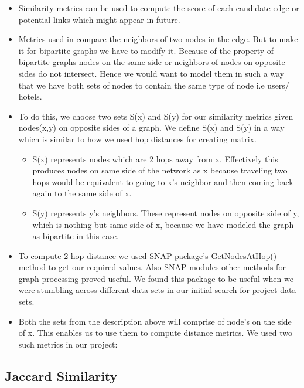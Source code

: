 \documentclass[letterpaper,twocolumn,11pt]{article}
\begin{document}
\begin{itemize}

\item Similarity metrics can be used to compute the score of each candidate edge or potential links which might appear in future.

\item Metrics used in \cite{four} compare the neighbors of two nodes in the edge. But to make it for bipartite graphs we have to modify it. Because of the property of bipartite graphs nodes on the same side or neighbors of nodes on opposite sides do not intersect. Hence we would want to model them in such a way that we have both sets of nodes to contain the same type of node i.e users/ hotels.

\item To do this, we choose two sets S(x) and S(y) for our similarity metrics given nodes(x,y) on opposite sides of a graph. We define S(x) and S(y) in a way which is similar to how we used hop distances for creating matrix.

\begin{itemize}
\item S(x) represents nodes which are 2 hops away from x. Effectively this produces nodes on same side of the network as x because traveling two hops would be equivalent to going to x's neighbor and then coming back again to the same side of x. 

\item S(y) represents y's neighbors. These represent nodes on opposite side of y, which is nothing but same side of x, because we have modeled the graph as bipartite in this case.
\end{itemize}

\item To compute 2 hop distance we used SNAP package's GetNodesAtHop() method to get our required values. Also SNAP modules other methods for graph processing proved useful. We found this package to be useful when we were stumbling across different data sets in our initial search for project data sets.

\item Both the sets from the description above will comprise of node's on the side of x.  This enables us to use them to compute distance metrics. We used two such metrics in our project:

\end{itemize}

\subsection{Jaccard Similarity}
\end{document}
